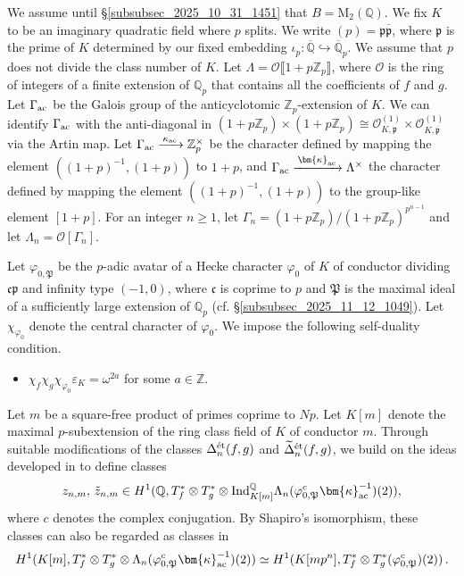 \documentclass{amsart}
\makeatletter
\numberwithin{equation}{section}
\newcommand{\mylabel}[2]{#2\def\@currentlabel{#2}\label{#1}}
\newcommand{\bb}{\mathbb}
\newcommand{\frk}{\mathfrak}
\newcommand{\QQ}{\mathbb{Q}}
\newcommand{\Qp}{{\mathbb{Q}_p}}
\newcommand{\cO}{\mathcal{O}}
\newcommand{\Ind}{\mathrm{Ind}}
\newcommand{\ac}{\textup{ac}}
\newcommand{\etale}{\textup{\'et}}
\makeatother
\begin{document}
\subsubsection{} We assume until \S\ref{subsubsec_2025_10_31_1451} that $B=\mathrm{M}_2(\bb{Q})$. We fix $K$ to be an imaginary quadratic field where $p$ splits. We write $(p)=\frk{p}\overline{\frk{p}}$, where $\frk{p}$ is the prime of $K$ determined by our fixed embedding $\iota_p:\overline{\bb{Q}}\hookrightarrow \overline{\bb{Q}}_p$. We assume that $p$ does not divide the class number of $K$. Let $\Lambda=\mathcal{O}\llbracket1+p\bb{Z}_p\rrbracket$, where $\cO$ is the ring of integers of a finite extension of $\Qp$ that contains all the coefficients of $f$ and $g$. Let $\Gamma_{\ac}$ be the Galois group of the anticyclotomic $\bb{Z}_p$-extension of $K$. We can identify $\Gamma_{\ac}$  with the anti-diagonal in $(1+p\bb{Z}_p)\times (1+p\bb{Z}_p)\cong \mathcal{O}_{K,\frk{p}}^{(1)}\times \mathcal{O}_{K,\overline{\frk{p}}}^{(1)}$ via the Artin map. Let 
$\Gamma_{\ac}\xrightarrow{\,\kappa_{\ac}\,} \bb{Z}_p^\times$ be the character defined by mapping the element $((1+p)^{-1},(1+p))$ to $1+p$, and $\Gamma_{\ac}\xrightarrow{\,\bm{\kappa}_{\ac}\,} \Lambda^\times$ the character defined by mapping the element $((1+p)^{-1}, (1+p))$ to the group-like element $[1+p]$. For an integer $n\ge1$, let $\Gamma_n=(1+p\bb{Z}_p)/(1+p\bb{Z}_p)^{p^{n-1}}$ and let $\Lambda_n=\mathcal{O}[\Gamma_n]$. 


Let $\varphi_{0,\frk{P}}$ be the $p$-adic avatar of a Hecke character $\varphi_0$ of $K$ of conductor dividing $\frk{cp}$ and infinity type $(-1,0)$, where $\frk{c}$ is coprime to $p$ and $\frk{P}$ is the maximal ideal of a sufficiently large extension of $\QQ_p$ (cf. \S\ref{subsubsec_2025_11_12_1049}). Let $\chi_{\varphi_0}$ denote the central character of $\varphi_0$. We impose the following self-duality condition.
\begin{itemize}
    \item[(\mylabel{item_self_duality}{\textbf{SD}})] $\chi_f\chi_g\chi_{\varphi_0}\varepsilon_K=\omega^{2a}$ for some $a\in \bb{Z}$.
\end{itemize}

Let $m$ be a square-free product of primes coprime to $Np$.  Let $K[m]$ denote the maximal $p$-subextension of the ring class field of $K$ of conductor $m$.
Through suitable modifications of the classes ${\Delta}_{n}^{\etale}(f,g)$ and $\widetilde{\Delta}_{n}^{\etale}(f,g)$, we build on the ideas developed in \cite{LLZ2} to define classes
\[
z_{n,m},\,\tilde{z}_{n,m}\in H^1(\bb{Q},T_f^*\otimes T_g^*\otimes \Ind_{K[m]}^{\bb{Q}}\Lambda_n(\varphi_{0,\frk{P}}^c\bm{\kappa}_{\ac}^{-1})(2)),
\]
where $c$ denotes the complex conjugation. By Shapiro's isomorphism, these classes can also be regarded as classes in
\[
H^1(K[m],T_f^\ast\otimes T_g^\ast\otimes \Lambda_n(\varphi_{0,\frk{P}}^c\bm{\kappa}_{\ac}^{-1})(2))
\simeq H^1(K[mp^n],T_f^\ast\otimes T_g^\ast(\varphi_{0,\frk{P}}^c)(2))\,.
\]
\end{document}
